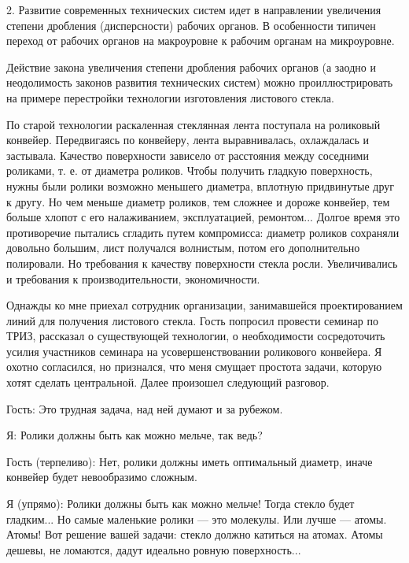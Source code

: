 2.  Развитие   современных  технических  систем  идет   в  направлении
увеличения  степени   дробления  (дисперсности)  рабочих   органов.  В
особенности  типичен  переход  от  рабочих органов  на  макроуровне  к
рабочим органам на микроуровне.


Действие  закона  увеличения  степени  дробления  рабочих  органов  (а
заодно  и  неодолимость  законов развития  технических  систем)  можно
проиллюстрировать  на  примере   перестройки  технологии  изготовления
листового стекла.

По  старой  технологии  раскаленная   стеклянная  лента  поступала  на
роликовый  конвейер. Передвигаясь  по конвейеру,  лента выравнивалась,
охлаждалась и  застывала. Качество поверхности зависело  от расстояния
между соседними  роликами, т. е.  от диаметра роликов.  Чтобы получить
гладкую  поверхность, нужны  были ролики  возможно меньшего  диаметра,
вплотную придвинутые друг к другу.  Но чем меньше диаметр роликов, тем
сложнее  и дороже  конвейер,  тем больше  хлопот  с его  налаживанием,
эксплуатацией,  ремонтом...  Долгое  время это  противоречие  пытались
сгладить  путем   компромисса:  диаметр  роликов   сохраняли  довольно
большим, лист получался волнистым, потом его дополнительно полировали.
Но  требования к  качеству поверхности  стекла росли.  Увеличивались и
требования к производительности, экономичности.

Однажды   ко   мне   приехал   сотрудник   организации,   занимавшейся
проектированием линий  для получения листового стекла.  Гость попросил
провести  семинар  по  ТРИЗ,   рассказал  о  существующей  технологии,
о   необходимости   сосредоточить   усилия  участников   семинара   на
усовершенствовании  роликового  конвейера.  Я  охотно  согласился,  но
признался,  что меня  смущает простота  задачи, которую  хотят сделать
центральной. Далее произошел следующий разговор.

Гость: Это трудная задача, над ней думают и за рубежом.

Я: Ролики должны быть как можно мельче, так ведь?

Гость (терпеливо): Нет, ролики должны иметь оптимальный диаметр, иначе
конвейер будет невообразимо сложным.

Я  (упрямо):  Ролики  должны  быть  как  можно  мельче!  Тогда  стекло
будет  гладким...  Но  самые  маленькие ролики  —  это  молекулы.  Или
лучше  —  атомы.  Атомы!  Вот  решение  вашей  задачи:  стекло  должно
катиться на атомах.  Атомы дешевы, не ломаются,  дадут идеально ровную
поверхность...

